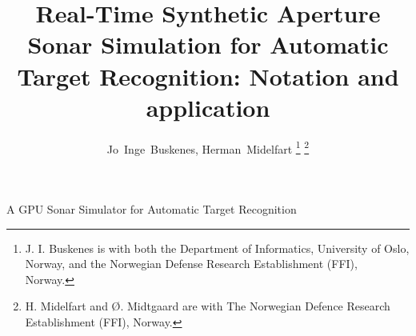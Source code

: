 

\title{Real-Time Synthetic Aperture Sonar Simulation for Automatic Target Recognition: Notation and application}

\author{{Jo~Inge~Buskenes, %
        Herman~Midelfart%
        } %
\thanks{J. I. Buskenes is with both the Department of Informatics, University of Oslo, Norway, and the Norwegian Defense Research Establishment (FFI), Norway.}%
\thanks{H. Midelfart and \O. Midtgaard are with The Norwegian Defence Research Establishment (FFI), Norway.}%
}

%
{A GPU Sonar Simulator for Automatic Target Recognition}




